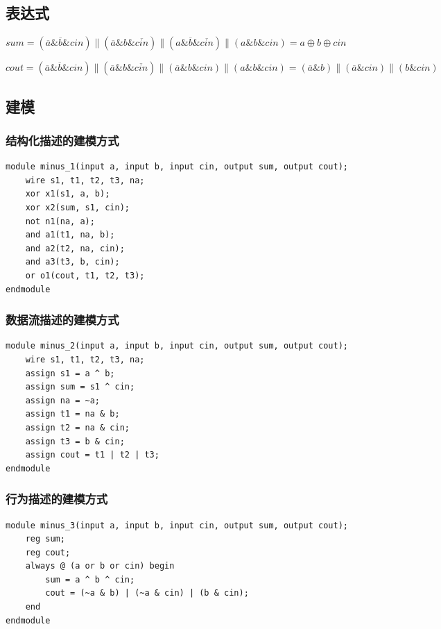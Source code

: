 \documentclass{article}
\begin{document}
\subsection{表达式}

$sum = (\overline{a} \& \overline{b} \& cin) \| (\overline{a} \& b \& \overline{cin}) \| (a \& \overline{b} \& \overline{cin}) \| (a \& b \& cin) = a \oplus b \oplus cin$

$cout = (\overline{a} \& \overline{b} \& cin) \| (\overline{a} \& b \& \overline{cin}) \| (\overline{a} \& b \& cin) \| (a \& b \& cin) = (\overline{a} \& b) \| (\overline{a} \& cin) \| (b \& cin)$

\subsection{建模}

\subsubsection{结构化描述的建模方式}

\begin{lstlisting}
module minus_1(input a, input b, input cin, output sum, output cout);
    wire s1, t1, t2, t3, na;
    xor x1(s1, a, b);
    xor x2(sum, s1, cin);
    not n1(na, a);
    and a1(t1, na, b);
    and a2(t2, na, cin);
    and a3(t3, b, cin);
    or o1(cout, t1, t2, t3);
endmodule
\end{lstlisting}

\subsubsection{数据流描述的建模方式}

\begin{lstlisting}
module minus_2(input a, input b, input cin, output sum, output cout);
    wire s1, t1, t2, t3, na;
    assign s1 = a ^ b;
    assign sum = s1 ^ cin;
    assign na = ~a;
    assign t1 = na & b;
    assign t2 = na & cin;
    assign t3 = b & cin;
    assign cout = t1 | t2 | t3;
endmodule
\end{lstlisting}

\subsubsection{行为描述的建模方式}

\begin{lstlisting}
module minus_3(input a, input b, input cin, output sum, output cout);
    reg sum;
    reg cout;
    always @ (a or b or cin) begin
        sum = a ^ b ^ cin;
        cout = (~a & b) | (~a & cin) | (b & cin);
    end
endmodule
\end{lstlisting}
\end{document}
